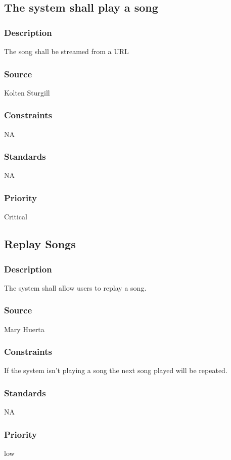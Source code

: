 \subsection{The system shall play a song }
\subsubsection{Description}
The song shall be streamed from a URL 
\subsubsection{Source}
Kolten Sturgill
\subsubsection{Constraints}
NA
\subsubsection{Standards}
NA
\subsubsection{Priority}
Critical



\subsection{Replay Songs}
\subsubsection{Description}
The system shall allow users to replay a song.
\subsubsection{Source}
Mary Huerta
\subsubsection{Constraints}
If the system isn't playing a song the next song played will be repeated. 
\subsubsection{Standards}
NA
\subsubsection{Priority}
low



